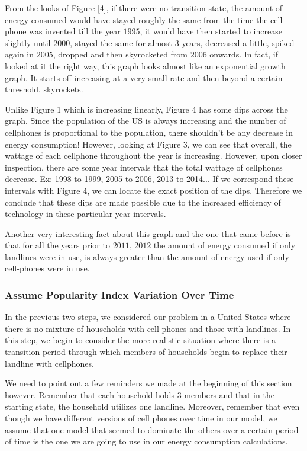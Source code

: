 \documentclass{article}
\begin{document}
From the looks of Figure \ref{4}, if there were no transition state, the amount of energy consumed would have stayed roughly the same from the time the cell phone was invented till the year $1995$, it would have then started to increase slightly until $2000$, stayed the same for almost $3$ years, decreased a little, spiked again in $2005$, dropped and then skyrocketed from $2006$ onwards. In fact, if looked at it the right way, this graph looks almost like an exponential growth graph. It starts off increasing at a very small rate and then beyond a certain threshold, skyrockets.\par 
Unlike Figure 1 which is increasing linearly, Figure 4 has some dips across the graph. Since the population of the US is always increasing and the number of cellphones is proportional to the population, there shouldn't be any decrease in energy consumption! However, looking at Figure 3, we can see that overall, the wattage of each cellphone throughout the year is increasing. However, upon closer inspection, there are some year intervals that the total wattage of cellphones decrease. Ex: 1998 to 1999, 2005 to 2006, 2013 to 2014... If we correspond these intervals with Figure 4, we can locate the exact position of the dips. Therefore we conclude that these dips are made possible due  to the increased efficiency of technology in these particular year intervals.\par
Another very interesting fact about this graph and the one that came before is that for all the years prior to $2011$, $2012$ the amount of energy consumed if only landlines were in use, is always greater than the amount of energy used if only cell-phones were in use.

\subsubsection{Assume Popularity Index Variation Over Time}
In the previous two steps, we considered our problem in a United States where there is no mixture of households with cell phones and those with landlines. In this step, we begin to consider the more realistic situation where there is a transition period through which members of households begin to replace their landline with cellphones.\par 
We need to point out a few reminders we made at the beginning of this section however. Remember that each household holds $3$ members and that in the starting state, the household utilizes one landline. Moreover, remember that even though we have different versions of cell phones over time in our model, we assume that one model that seemed to dominate the others over a certain period of time is the one we are going to use in our energy consumption calculations.\par 
\end{document}
